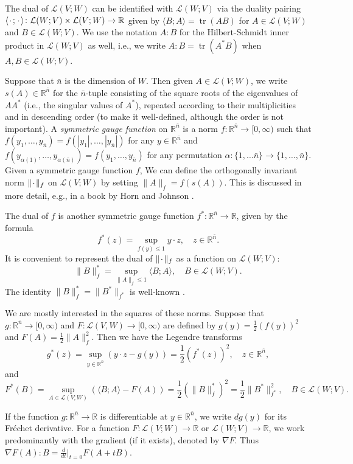 \documentclass[10pt,a4paper]{amsart}
\newcommand{\R}{\mathbb{R}}
\newcommand{\ndim}{{\bar{n}}}
\newcommand{\Lin}{\mathcal{L}}
\DeclareMathOperator{\tr}{tr}
\newcommand{\blank}{{\mkern 2mu\cdot\mkern 2mu}}
\newcommand{\pairing}[2]{\langle #1; #2 \rangle}
\begin{document}
The dual of $\Lin(V; W)$ can be identified with $\Lin(W; V)$ via the
duality pairing
$\pairing{\blank}{\blank} \colon \Lin(W; V) \times \Lin(V; W) \to \R$ given by 
$\pairing{B}{A} = \tr(AB)$ for $A \in \Lin(V; W)$ and $B \in \Lin(W; V)$.
We use the notation $A : B$ for the Hilbert-Schmidt inner product in
$\Lin(W; V)$ as well, i.e., we write $A : B = \tr(A^* B)$ when $A, B \in \Lin(W; V)$.

Suppose that $\ndim$ is the dimension of $W$. Then given $A \in \Lin(V; W)$,
we write $s(A) \in \R^\ndim$ for the $\ndim$-tuple
consisting of the square roots of the eigenvalues of $A A^*$ (i.e., the singular values of $A^*$), repeated according to their multiplicities
and in descending order (to make it well-defined, although the order is not important).
A \emph{symmetric gauge function} on $\R^\ndim$ is a norm
$f \colon \R^\ndim \to [0, \infty)$ such that $f(y_1, \dotsc, y_\ndim) = f(|y_1|, \dotsc, |y_\ndim|)$
for any $y \in \R^\ndim$ and $f(y_{\alpha(1)}, \dotsc, y_{\alpha(\ndim)}) = f(y_1, \dotsc, y_\ndim)$
for any permutation $\alpha \colon \{1, \dotsc \ndim\} \to \{1, \dotsc, \ndim\}$. Given a symmetric gauge function $f$,
We can define the orthogonally invariant norm $\|\blank\|_f$ on $\Lin(V; W)$ by setting $\|A\|_f = f(s(A))$.
This is discussed in more detail, e.g., in a book by Horn and Johnson \cite{Horn-Johnson:85}.

The dual of $f$ is another symmetric gauge function $f^* \colon \R^\ndim \to \R$,
given by the formula
\[
f^*(z) = \sup_{f(y) \le 1} y \cdot z, \quad z \in \R^\ndim.
\]
It is convenient to represent the dual of $\|\blank\|_f$ as a function on
$\Lin(W; V)$:
\[
\|B\|_f^* = \sup_{\|A\|_f \le 1} \pairing{B}{A}, \quad B \in \Lin(W; V).
\]
The identity $\|B\|_f^* = \|B^*\|_{f^*}$ is well-known
\cite[pp.\ 439--440]{Horn-Johnson:85}.

We are mostly interested in the squares of these norms. Suppose that $g \colon \R^\ndim \to [0, \infty)$ and
$F \colon \Lin(V, W) \to [0, \infty)$ are defined by $g(y) = \frac{1}{2} (f(y))^2$ and $F(A) = \frac{1}{2} \|A\|_f^2$.
Then we have the Legendre transforms
\[
g^*(z) = \sup_{y \in \R^\ndim} (y \cdot z - g(y)) = \frac{1}{2} (f^*(z))^2, \quad z \in \R^\ndim,
\]
and
\[
F^*(B) = \sup_{A \in \Lin(V; W)} (\pairing{B}{A} - F(A)) = \frac{1}{2} (\|B\|_f^*)^2 = \frac{1}{2}\|B^*\|_{f^*}^2, \quad B \in \Lin(W; V).
\]

If the function $g \colon \R^\ndim \to \R$ is differentiable at $y \in \R^\ndim$, we write $dg(y)$ for its Fr\'echet derivative.
For a function $F \colon \Lin(V; W) \to \R$ or $\Lin(W; V) \to \R$, we work predominantly with the gradient (if it exists),
denoted by $\nabla F$. Thus $\nabla F(A) : B = \frac{d}{dt}|_{t = 0} F(A + tB)$.
\end{document}
